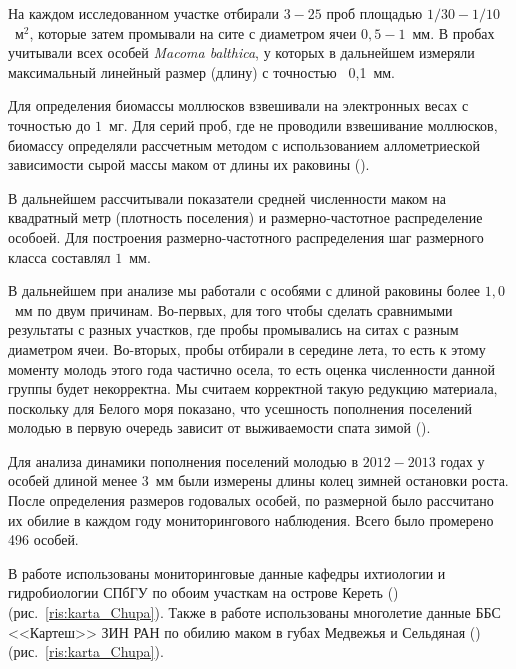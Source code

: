 На каждом исследованном участке отбирали $3 - 25$ проб площадью $1/30 - 1/10$~м$^2$, которые затем промывали на сите с диаметром ячеи $0,5 - 1$~мм. 
В пробах учитывали всех особей {\it Macoma balthica}, у которых в дальнейшем измеряли максимальный линейный размер (длину) с точностью ~0,1~мм. 

Для определения биомассы моллюсков взвешивали на электронных весах с точностью до $1$~мг. 
Для серий проб, где не проводили взвешивание моллюсков, биомассу определяли рассчетным методом с использованием аллометриеской зависимости сырой массы маком от длины их раковины (\cite{Maximovich_et_al_1993}). 

В дальнейшем рассчитывали показатели средней численности маком на квадратный метр (плотность поселения) и размерно-частотное распределение особоей.
Для построения размерно-частотного распределения шаг размерного класса составлял $1$~мм.

В дальнейшем при анализе мы работали с особями с длиной раковины более $1,0$~мм по двум причинам. 
Во-первых, для того чтобы сделать сравнимыми результаты с разных участков, где пробы промывались на ситах с разным диаметром ячеи. 
Во-вторых, пробы отбирали в середине лета, то есть к этому моменту молодь этого года частично осела, то есть оценка численности данной группы будет некорректна.
Мы считаем корректной такую редукцию материала, поскольку для Белого моря показано, что усешность пополнения поселений молодью в первую очередь зависит от выживаемости спата зимой (\cite{Maximovich_Gerasimova_2004}).

Для анализа динамики пополнения поселений молодью в $2012 - 2013$ годах у особей длиной менее $3$~мм были измерены длины колец зимней остановки роста. 
После определения размеров годовалых особей, по размерной было рассчитано их обилие в каждом году мониторингового наблюдения.
Всего было промерено 496 особей.



В работе использованы мониторинговые данные кафедры ихтиологии и гидробиологии СПбГУ по обоим участкам на острове Кереть (\cite{Maximovich_et_al_1991, Gerasimova_Maximovich_2013}) (рис.~\ref{ris:karta_Chupa}). 
Также в работе использованы многолетие данные ББС <<Картеш>> ЗИН РАН по обилию маком в губах Медвежья и Сельдяная (\cite{Varfolomeeva_Naumov_2013}) (рис.~\ref{ris:karta_Chupa}).


 



